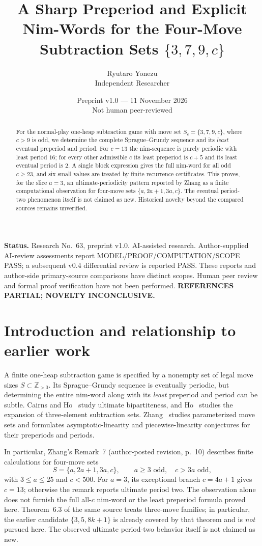 \documentclass[10pt,a4paper]{article}
\title{A Sharp Preperiod and Explicit Nim-Words for the Four-Move Subtraction Sets $\{3,7,9,c\}$}
\author{Ryutaro Yonezu\\\small Independent Researcher}
\date{Preprint v1.0 --- 11 November 2026\\\small Not human peer-reviewed}
\begin{document}
\maketitle
\begin{abstract}
For the normal-play one-heap subtraction game with move set $S_c=\{3,7,9,c\}$, where $c>9$ is odd, we determine the complete Sprague--Grundy sequence and its \emph{least} eventual preperiod and period. For $c=13$ the nim-sequence is purely periodic with least period $16$; for every other admissible $c$ its least preperiod is $c+5$ and its least eventual period is $2$. A single block expression gives the full nim-word for all odd $c\ge23$, and six small values are treated by finite recurrence certificates. This proves, for the slice $a=3$, an ultimate-periodicity pattern reported by Zhang as a finite computational observation for four-move sets $\{a,2a+1,3a,c\}$. The eventual period-two phenomenon itself is not claimed as new. Historical novelty beyond the compared sources remains unverified.
\end{abstract}

\noindent\textbf{Status.} Research No.~63, preprint v1.0. AI-assisted research. Author-supplied AI-review assessments report MODEL/PROOF/COMPUTATION/SCOPE PASS; a subsequent v0.4 differential review is reported PASS. These reports and author-side primary-source comparisons have distinct scopes. Human peer review and formal proof verification have not been performed. \textbf{REFERENCES PARTIAL; NOVELTY INCONCLUSIVE.}

\section{Introduction and relationship to earlier work}
A finite one-heap subtraction game is specified by a nonempty set of legal move sizes $S\subset\mathbb{Z}_{>0}$. Its Sprague--Grundy sequence is eventually periodic, but determining the entire nim-word along with its \emph{least} preperiod and period can be subtle. Cairns and Ho~\cite{CairnsHo2010} study ultimate bipartiteness, and Ho~\cite{Ho2015} studies the expansion of three-element subtraction sets. Zhang~\cite{Zhang2024} studies parameterized move sets and formulates asymptotic-linearity and piecewise-linearity conjectures for their preperiods and periods.

In particular, Zhang's Remark~7 (author-posted revision, p.~10) describes finite calculations for four-move sets
\[S=\{a,2a+1,3a,c\},\qquad a\ge3\text{ odd},\quad c>3a\text{ odd},\]
with $3\le a\le25$ and $c<500$. For $a=3$, its exceptional branch $c=4a+1$ gives $c=13$; otherwise the remark reports ultimate period two. The observation alone does not furnish the full all-$c$ nim-word or the least preperiod formula proved here. Theorem~6.3 of the same source treats three-move families; in particular, the earlier candidate $\{3,5,8k+1\}$ is already covered by that theorem and is \emph{not} pursued here. The observed ultimate period-two behavior itself is not claimed as new.
\end{document}
